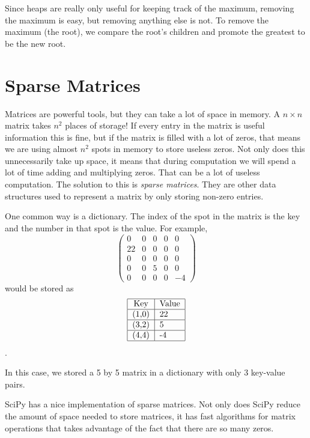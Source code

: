 Since heaps are really only useful for keeping track of the maximum, removing the maximum is easy, but removing anything else is not.
To remove the maximum (the root), we compare the root's children and promote the greatest to be the new root.


\section*{Sparse Matrices}
Matrices are powerful tools, but they can take a lot of space in memory.
A $n \times n$ matrix takes $n^2$ places of storage!
If every entry in the matrix is useful information this is fine, but if the matrix is filled with a lot of zeros, that means we are using almost $n^2$ spots in memory to store useless zeros.
Not only does this unnecessarily take up space, it means that during computation we will spend a lot of time adding and multiplying zeros.
That can be a lot of useless computation.
The solution to this is \emph{sparse matrices}.
They are other data structures used to represent a matrix by only storing non-zero entries.

One common way is a dictionary.
The index of the spot in the matrix is the key and the number in that spot is the value.
For example,
\[
\begin{pmatrix}
0 & 0 & 0 & 0 & 0 \\
22 & 0 & 0 & 0 & 0 \\
0 & 0 & 0 & 0 & 0 \\
0 & 0 & 5 & 0 & 0 \\
0 & 0 & 0 & 0 & -4
\end{pmatrix}
\]
would be stored as
\[
\begin{tabular}{|c|l|}
\hline
Key & Value \\
\hline
(1,0) & 22 \\
\hline
(3,2) & 5 \\
\hline
(4,4) & -4 \\
\hline
\end{tabular}
\].

In this case, we stored a 5 by 5 matrix in a dictionary with only 3 key-value pairs.

SciPy has a nice implementation of sparse matrices.
Not only does SciPy reduce the amount of space needed to store matrices, it has fast algorithms for matrix operations that takes advantage of the fact that there are so many zeros.

